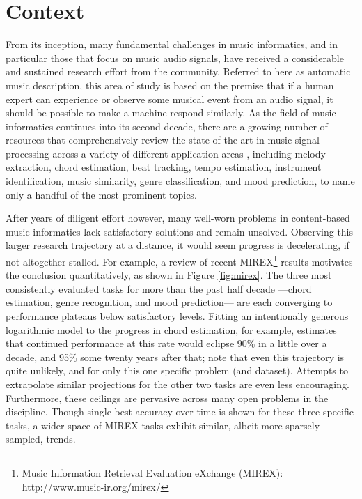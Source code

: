 

\graphicspath{{2/figures/}}

\chapter{Context}
\label{chp:context}


From its inception, many fundamental challenges in music informatics, and in particular those that focus on music audio signals, have received a considerable and sustained research effort from the community.
Referred to here as automatic music description, this area of study is based on the premise that if a human expert can experience or observe some musical event from an audio signal, it should be possible to make a machine respond similarly.
As the field of music informatics continues into its second decade, there are a growing number of resources that comprehensively review the state of the art in music signal processing across a variety of different application areas \cite{Klapuri2006,Casey2008,Mueller2011a}, including melody extraction, chord estimation, beat tracking, tempo estimation, instrument identification, music similarity, genre classification, and mood prediction, to name only a handful of the most prominent topics.

After years of diligent effort however, many well-worn problems in content-based music informatics lack satisfactory solutions and remain unsolved.
Observing this larger research trajectory at a distance, it would seem progress is decelerating, if not altogether stalled.
For example, a review of recent MIREX\footnote{Music Information Retrieval Evaluation eXchange (MIREX): {http://www.music-ir.org/mirex/}} results motivates the conclusion quantitatively, as shown in Figure \ref{fig:mirex}.
The three most consistently evaluated tasks for more than the past half decade ---chord estimation, genre recognition, and mood prediction--- are each converging to performance plateaus below satisfactory levels.
Fitting an intentionally generous logarithmic model to the progress in chord estimation, for example, estimates that continued performance at this rate would eclipse 90\% in a little over a decade, and 95\% some twenty years after that; note that even this trajectory is quite unlikely, and for only this one specific problem (and dataset).
Attempts to extrapolate similar projections for the other two tasks are even less encouraging.
Furthermore, these ceilings are pervasive across many open problems in the discipline.
Though single-best accuracy over time is shown for these three specific tasks, a wider space of MIREX tasks exhibit similar, albeit more sparsely sampled, trends.

